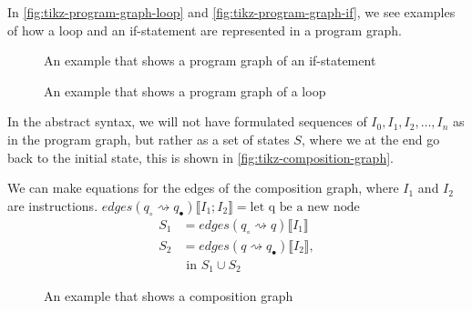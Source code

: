 In \autoref{fig:tikz-program-graph-loop} and \autoref{fig:tikz-program-graph-if}, we see examples of how a loop and an if-statement are represented in a program graph.

\begin{figure}[htb!]
    \center
    
    \caption{An example that shows a program graph of an if-statement}
    \label{fig:tikz-program-graph-if}
\end{figure}

\begin{figure}[htb!]
    \center
    
    \caption{An example that shows a program graph of a loop}
    \label{fig:tikz-program-graph-loop}
\end{figure}

In the abstract syntax, we will not have formulated sequences of $I_0, I_1, I_2, \dots, I_n$ as in the program graph, but rather as a set of states $S$, where we at the end go back to the initial state, this is shown in \autoref{fig:tikz-composition-graph}.

We can make equations for the edges of the composition graph, where $I_1$ and $I_2$ are instructions.
$edges(q_{\circ} \rightsquigarrow q_{\bullet})\llbracket I_1 ; I_2 \rrbracket = \text{let q be a new node}$
\begin{align}
S_1 &= edges(q_{\circ} \rightsquigarrow q)\llbracket I_1 \rrbracket\\
S_2 &= edges(q \rightsquigarrow q_{\bullet})\llbracket I_2 \rrbracket, \\
&\text{ in } S_1 \cup S_2
\end{align}

\begin{figure}
    \center
    
    \caption{An example that shows a composition graph}
    \label{fig:tikz-composition-graph}
\end{figure}
